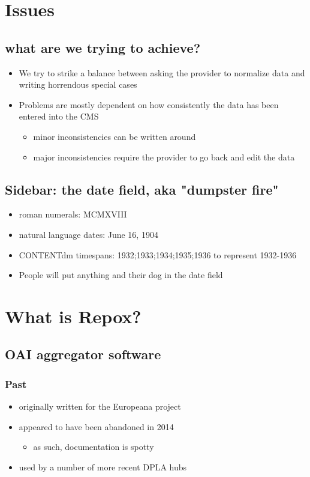 \documentclass[11pt]{article}
\begin{document}
\section*{Issues}
\label{sec:org28ae07e}
\subsection*{what are we trying to achieve?}
\label{sec:org399c97a}
\begin{itemize}
\item We try to strike a balance between asking the provider to normalize data and writing horrendous special cases
\item Problems are mostly dependent on how consistently the data has been entered into the CMS
\begin{itemize}
\item minor inconsistencies can be written around
\item major inconsistencies require the provider to go back and edit the data
\end{itemize}
\end{itemize}

\subsection*{Sidebar: the date field, aka "dumpster fire"}
\label{sec:orgd0c6fb8}
\begin{itemize}
\item roman numerals: MCMXVIII
\item natural language dates: June 16, 1904
\item CONTENTdm timespans: 1932;1933;1934;1935;1936 to represent 1932-1936
\item People will put anything and their dog in the date field
\end{itemize}

\section*{What is Repox?}
\label{sec:org3219041}
\subsection*{OAI aggregator software}
\label{sec:org6aae1f5}
\subsubsection*{Past}
\label{sec:org8d5d59f}
\begin{itemize}
\item originally written for the Europeana project
\item appeared to have been abandoned in 2014
\begin{itemize}
\item as such, documentation is spotty
\end{itemize}
\item used by a number of more recent DPLA hubs
\end{itemize}
\end{document}
